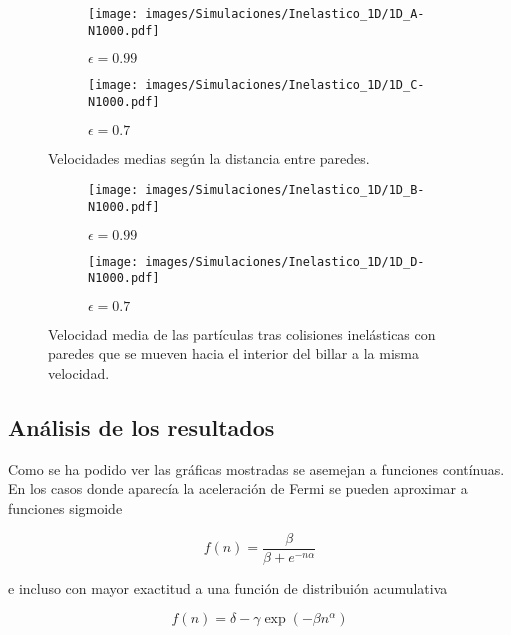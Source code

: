 \documentclass[11pt, spanish]{book}
\begin{document}
\begin{figure}[H]
    \begin{subfigure}[b]{0.5\textwidth}
        \centering
        \texttt{[image: images/Simulaciones/Inelastico\_1D/1D\_A-N1000.pdf]}
        \caption{$\epsilon = 0.99$}
    \end{subfigure}
    \hfill
    \begin{subfigure}[b]{0.5\textwidth}
        \centering
        \texttt{[image: images/Simulaciones/Inelastico\_1D/1D\_C-N1000.pdf]}
        \caption{$\epsilon = 0.7$}
    \end{subfigure}
    \caption{Velocidades medias según la distancia entre paredes.}
    \label{fig:1D_inelastic_A}
\end{figure}

\begin{figure}[H]
    \begin{subfigure}[b]{0.5\textwidth}
        \centering
        \texttt{[image: images/Simulaciones/Inelastico\_1D/1D\_B-N1000.pdf]}
        \caption{$\epsilon = 0.99$}
    \end{subfigure}
    \hfill
    \begin{subfigure}[b]{0.5\textwidth}
        \centering
        \texttt{[image: images/Simulaciones/Inelastico\_1D/1D\_D-N1000.pdf]}
        \caption{$\epsilon = 0.7$}
    \end{subfigure}
    \caption{Velocidad media de las partículas tras colisiones inelásticas con paredes que se mueven hacia el interior del billar a la misma velocidad.}
    \label{fig:1D_inelastic_B}
\end{figure}

\subsection{Análisis de los resultados}

Como se ha podido ver las gráficas mostradas se asemejan a funciones contínuas. En los casos donde aparecía la aceleración de Fermi se pueden aproximar a funciones sigmoide

\begin{equation}
    f(n) = \dfrac{\beta}{\beta + e^{-n\alpha}}
\end{equation}

e incluso con mayor exactitud a una función de distribuión acumulativa

\begin{equation}\label{eq:acumulativa_general}
    f(n) = \delta - \gamma\exp(-\beta n^\alpha)
\end{equation}
\end{document}
